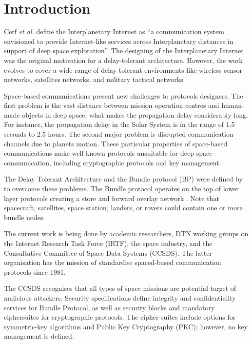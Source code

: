 \section{Introduction}

Cerf \textit{et al.} \cite{cerf2007delay} define the Interplanetary Internet as ``a communication system envisioned to provide Internet-like services across Interplanetary distances in support of deep space exploration''. The designing of the Interplanetary Internet was the original motivation for a delay-tolerant architecture. However, the work evolves to cover a wide range of delay tolerant environments like wireless sensor networks, satellites networks, and military tactical networks. 

Space-based communications present new challenges to protocols designers. The first problem is the vast distance between mission operation centres and human-made objects in deep space, what makes the propagation delay considerably long. For instance, the propagation delay in the Solar System is in the range of 1.5 seconds to  2.5 hours. The second major problem is disrupted communication channels due to planets motion. These particular properties of space-based communications make well-known protocols unsuitable for deep space communication, including cryptographic protocols and key management.  


The Delay Tolerant Architecture \cite{cerf2007delay} and the Bundle protocol (BP) \cite{scott2007bundle} were defined by to overcome these problems. The Bundle protocol operates on the top of lower layer protocols creating a store and forward overlay network \cite{ivancic2009security}. Note that spacecraft, satellites, space station, landers, or rovers could contain one or more bundle nodes.


The current work is being done by academic researchers, DTN working groups on the Internet Research Task Force (IRTF), the space industry, and the Consultative Committee of Space Data Systems (CCSDS). The latter organisation has the mission of standardise spaced-based communication protocols since 1981.


The CCSDS recognises that all types of space missions are potential target of malicious attackers.  Security specifications \cite{ietf-dtn-bibect-00,ietf-dtn-bpsec-07,rfc6257} define integrity and confidentiality services for Bundle Protocol, as well as security blocks and mandatory ciphersuites for cryptographic protocols. The cipher-suites include options for symmetric-key algorithms and Public Key Cryptography (PKC); however, no key management is defined. 


